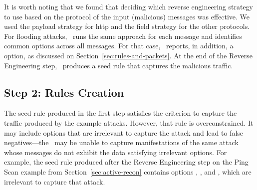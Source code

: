 \documentclass[sigconf,review, anonymous]{acmart}
\begin{document}
It is worth noting that we found that deciding which reverse
engineering strategy to use based on the protocol of the input
(malicious) messages was effective. We used the payload strategy for
http and the field strategy for the other protocols. For flooding
attacks, \tname\ runs the same approach for each message and
identifies common options across all messages. For that case,
\tname\ reports, in addition, a  option, as
discussed on Section~\ref{sec:rules-and-packets}.  At the end of the
Reverse Engineering step, \tname\ produces a seed rule that captures
the malicious traffic.





\subsection{Step 2: Rules Creation}
\label{sec:minimization}

The seed rule produced in the first step satisfies the criterion to
capture the traffic produced by the example attacks. However, that
rule is overconstrained.  It may include options that are irrelevant
to capture the attack and lead to false negatives---the \nids\ may be
unable to capture manifestations of the same attack whose messages do
not exhibit the data satisfying irrelevant options. For example, the
seed rule produced after the Reverse Engineering step on the Ping Scan
example from Section~\ref{sec:active-recon} contains options
, , and
, which are irrelevant to capture that attack.
\end{document}
